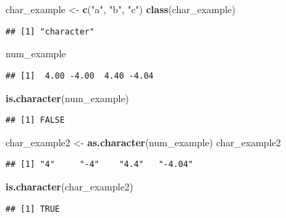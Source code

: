 \documentclass[]{article}
\newenvironment{Shaded}{\begin{snugshade}}{\end{snugshade}}
\newcommand{\KeywordTok}[1]{\textcolor[rgb]{0.13,0.29,0.53}{\textbf{#1}}}
\newcommand{\StringTok}[1]{\textcolor[rgb]{0.31,0.60,0.02}{#1}}
\newcommand{\NormalTok}[1]{#1}
\begin{document}
\begin{Shaded}
\begin{Highlighting}[]
\NormalTok{char_example <-}\StringTok{ }\KeywordTok{c}\NormalTok{(}\StringTok{"a"}\NormalTok{, }\StringTok{"b"}\NormalTok{, }\StringTok{"c"}\NormalTok{)}
\KeywordTok{class}\NormalTok{(char_example)}
\end{Highlighting}
\end{Shaded}

\begin{verbatim}
## [1] "character"
\end{verbatim}

\begin{Shaded}
\begin{Highlighting}[]
\NormalTok{num_example}
\end{Highlighting}
\end{Shaded}

\begin{verbatim}
## [1]  4.00 -4.00  4.40 -4.04
\end{verbatim}

\begin{Shaded}
\begin{Highlighting}[]
\KeywordTok{is.character}\NormalTok{(num_example)}
\end{Highlighting}
\end{Shaded}

\begin{verbatim}
## [1] FALSE
\end{verbatim}

\begin{Shaded}
\begin{Highlighting}[]
\NormalTok{char_example2 <-}\StringTok{ }\KeywordTok{as.character}\NormalTok{(num_example)}
\NormalTok{char_example2}
\end{Highlighting}
\end{Shaded}

\begin{verbatim}
## [1] "4"     "-4"    "4.4"   "-4.04"
\end{verbatim}

\begin{Shaded}
\begin{Highlighting}[]
\KeywordTok{is.character}\NormalTok{(char_example2)}
\end{Highlighting}
\end{Shaded}

\begin{verbatim}
## [1] TRUE
\end{verbatim}
\end{document}

